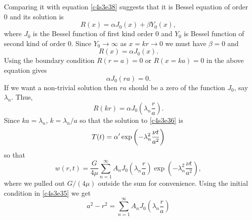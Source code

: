 \begin{itemize}
Comparing it with equation \eqref{c4s3e38} suggests that it is Bessel equation of order $0$ and its
solution is
\begin{equation}\label{c4s3e39}
R(x) = \alpha J_0(x) + \beta Y_0(x),
\end{equation}
where $J_0$ is the Bessel function of first kind order $0$ and $Y_0$ is Bessel function of second kind
of order $0$. Since $Y_0 \rightarrow \infty$ as $x = kr \rightarrow 0$ we must have $\beta = 0$ and
\begin{equation}\label{c4s3e40}
R(x) = \alpha J_0(x).
\end{equation}
Using the boundary condition $R(r = a) = 0$ or $R(x = ka) = 0$ in the above equation gives
\[
\alpha J_0(ra) = 0.
\]
If we want a non-trivial solution then $ra$ should be a zero of the function $J_0$, say $\lambda_n$.
Thus,
\[
R(kr) = \alpha J_0\left(\lambda_n\frac{r}{a}\right).
\]
Since $ka = \lambda_n$, $k = \lambda_n/a$ so that the solution to \eqref{c4s3e36} is
\[
T(t) = \alpha^\prime\exp\left(-\lambda_n^2\frac{\nu t}{a^2}\right)
\]
so that
\begin{equation}\label{c4s3e41}
w(r, t) = \frac{G}{4\mu}\sum_{n=1}^\infty A_n J_0\left(\lambda_n\frac{r}{a}\right)\exp\left(-\lambda_n^2\frac{\nu t}{a^2}\right),
\end{equation}
where we pulled out $G/(4\mu)$ outside the sum for convenience. Using the initial condition in 
\eqref{c4s3e35} we get
\begin{equation}\label{c4s3e42}
a^2 - r^2 = \sum_{n=1}^\infty A_n J_0\left(\lambda_n\frac{r}{a}\right)
\end{equation}

\end{itemize}
